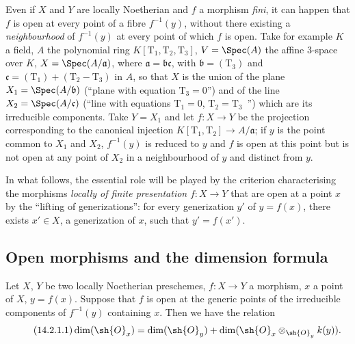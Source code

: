 \begin{remark}[14.1.5]
\label{IV.14.1.5}
Even if $X$ and $Y$ are locally Noetherian and $f$ a morphism \emph{fini}, it can happen that $f$ is open at every point of a fibre $f^{-1}(y)$, without there existing a \emph{neighbourhood} of $f^{-1}(y)$ at every point of which $f$ is open.
Take for example $K$ a field, $A$ the polynomial ring $K[\mathrm{T}_1,\mathrm{T}_2,\mathrm{T}_3]$, $V=\Spec(A)$ the affine $3$-space over $K$, $X=\Spec(A/\mathfrak{a})$, where $\mathfrak{a}=\mathfrak{b}\mathfrak{c}$, with $\mathfrak{b}=(\mathrm{T}_3)$ and $\mathfrak{c}=(\mathrm{T}_1)+(\mathrm{T}_2-\mathrm{T}_3)$ in $A$, so that $X$ is the union of the plane $X_1=\Spec(A/\mathfrak{b})$ (``plane with equation $\mathrm{T}_3=0$'') and of the line $X_2=\Spec(A/\mathfrak{c})$ (``line with equations $\mathrm{T}_1=0$, $\mathrm{T}_2=\mathrm{T}_3$~'') which are its irreducible components.
Take $Y=X_1$ and let $f:X\to Y$ be the projection corresponding to the canonical injection $K[\mathrm{T}_1,\mathrm{T}_2]\to A/\mathfrak{a}$; if $y$ is the point common to $X_1$ and $X_2$, $f^{-1}(y)$ is reduced to $y$ and $f$ is open at this point but is not open at any point of $X_2$ in a neighbourhood of $y$ and distinct from $y$.
\end{remark}

\begin{env}[14.1.6]
\label{IV.14.1.6}
In what follows, the essential role will be played by the criterion  characterising the morphisms \emph{locally of finite presentation} $f:X\to Y$ that are open at a point $x$ by the ``lifting of generizations'': for every generization $y'$ of $y=f(x)$, there exists $x'\in X$, a generization of $x$, such that $y'=f(x')$.
\end{env}

\subsection{Open morphisms and the dimension formula}
\label{subsection:IV.14.2}

\begin{theorem}[14.2.1]
\label{IV.14.2.1}
Let $X$, $Y$ be two locally Noetherian preschemes, $f:X\to Y$ a morphism, $x$ a point of $X$, $y=f(x)$.
Suppose that $f$ is open at the generic points of the irreducible components of $f^{-1}(y)$ containing $x$.
Then we have the relation
\begin{equation}
\tag{14.2.1.1}
\label{IV.14.2.1.1}
  \dim(\sh{O}_x)=\dim(\sh{O}_y)+\dim(\sh{O}_x\otimes_{\sh{O}_y}k(y)).
\end{equation}
\end{theorem}

